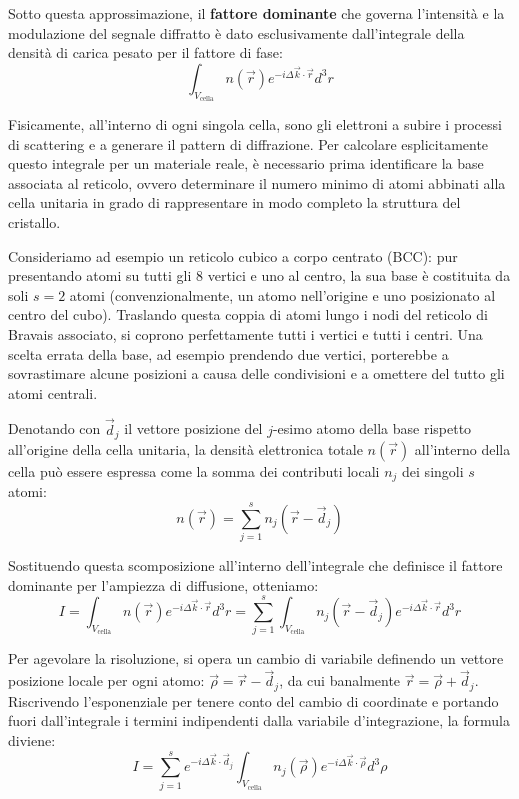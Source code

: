 Sotto questa approssimazione, il \textbf{fattore dominante} che governa l'intensità e la modulazione del segnale diffratto è dato esclusivamente dall'integrale della densità di carica pesato per il fattore di fase:
\begin{equation}
    \int_{V_{\text{cella}}} n(\vec{r}) e^{-i \Delta\vec{k} \cdot \vec{r}} d^3r
\end{equation}

Fisicamente, all'interno di ogni singola cella, sono gli elettroni a subire i processi di scattering e a generare il pattern di diffrazione. Per calcolare esplicitamente questo integrale per un materiale reale, è necessario prima identificare la base associata al reticolo, ovvero determinare il numero minimo di atomi abbinati alla cella unitaria in grado di rappresentare in modo completo la struttura del cristallo.

Consideriamo ad esempio un reticolo cubico a corpo centrato (BCC): pur presentando atomi su tutti gli 8 vertici e uno al centro, la sua base è costituita da soli \(s = 2\) atomi (convenzionalmente, un atomo nell'origine e uno posizionato al centro del cubo). Traslando questa coppia di atomi lungo i nodi del reticolo di Bravais associato, si coprono perfettamente tutti i vertici e tutti i centri. Una scelta errata della base, ad esempio prendendo due vertici, porterebbe a sovrastimare alcune posizioni a causa delle condivisioni e a omettere del tutto gli atomi centrali.

Denotando con \(\vec{d}_j\) il vettore posizione del \(j\)-esimo atomo della base rispetto all'origine della cella unitaria, la densità elettronica totale \(n(\vec{r})\) all'interno della cella può essere espressa come la somma dei contributi locali \(n_j\) dei singoli \(s\) atomi:
\begin{equation}
    n(\vec{r}) = \sum_{j=1}^{s} n_j(\vec{r} - \vec{d}_j)
\end{equation}

Sostituendo questa scomposizione all'interno dell'integrale che definisce il fattore dominante per l'ampiezza di diffusione, otteniamo:
\begin{equation}
    I = \int_{V_{\text{cella}}} n(\vec{r}) e^{-i \Delta\vec{k} \cdot \vec{r}} d^3r = \sum_{j=1}^{s} \int_{V_{\text{cella}}} n_j(\vec{r} - \vec{d}_j) e^{-i \Delta\vec{k} \cdot \vec{r}} d^3r
\end{equation}

Per agevolare la risoluzione, si opera un cambio di variabile definendo un vettore posizione locale per ogni atomo: \(\vec{\rho} = \vec{r} - \vec{d}_j\), da cui banalmente \(\vec{r} = \vec{\rho} + \vec{d}_j\). Riscrivendo l'esponenziale per tenere conto del cambio di coordinate e portando fuori dall'integrale i termini indipendenti dalla variabile d'integrazione, la formula diviene:
\begin{equation}
    I = \sum_{j=1}^{s} e^{-i \Delta\vec{k} \cdot \vec{d}_j} \int_{V_{\text{cella}}} n_j(\vec{\rho}) e^{-i \Delta\vec{k} \cdot \vec{\rho}} d^3\rho
\end{equation}


